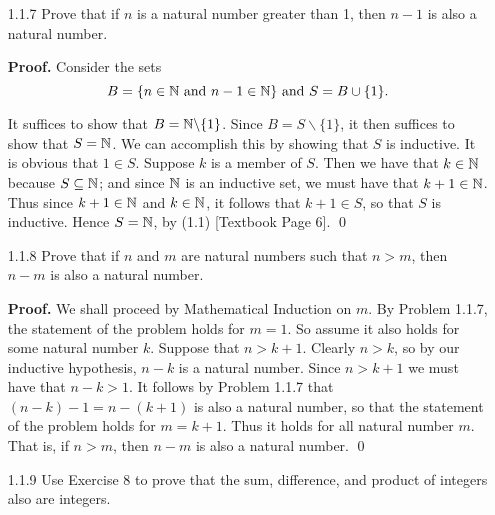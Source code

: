 \begin{enumerate}
      \begin{enumerate}
         \item Since the set of Natural numbers is an inductive set and since
               $m$ is a natural, it must be the case that $m + 1$ is a natural
               number. So assume that for some natural number $k$ that $m + k$ 
               is also a natural number. As we argued above, $(m + k) + 1$
               must also be a natural number. Thus $m + n$ is a natural number
               for all natural numbers $n$. \qed
         \item We have $m \cdot 1 = m$, a natural number by assumption. So 
               assume that for some natural number $k$ that $mk$ is a natural 
               number. Then $m(k+1) = mk + m$. Part (a) tells us that $mk + m$
               is a natural number. Thus $mk$ is a natural number for all
               natural numbers $n$. \qed
      \end{enumerate}
   \item[1.1.7]   Prove that if $n$ is a natural number greater than 1, then
                  $n - 1$ is also a natural number.

      \textbf{Proof.} Consider the sets
      $$B = \{n \in \mathbb{N} \mbox{ and } n - 1 \in \mathbb{N}\} \mbox{ and } 
        S = B \cup \{1\}.$$

      It suffices to show that $B = \mathbb{N}\backslash\{1\}$. Since
      $B = S\backslash\{1\}$, it then suffices to show that $S = \mathbb{N}$. We can
      accomplish this by showing that $S$ is inductive. It is obvious that
      $1 \in S$. Suppose $k$ is a member of $S$. Then we have that $k \in \mathbb{N}$ 
      because $S \subseteq \mathbb{N}$; and since $\mathbb{N}$ is an inductive set, we must have
      that $k + 1 \in \mathbb{N}$. Thus since $k + 1 \in \mathbb{N}$ and $k \in \mathbb{N}$, it follows 
      that $k + 1 \in S$, so that $S$ is inductive. Hence $S = \mathbb{N}$, by (1.1) 
      [Textbook Page 6].  \qed
   \item[1.1.8]   Prove that if $n$ and $m$ are natural numbers such that
                  $n > m$, then $n - m$ is also a natural number.

      \textbf{Proof.} We shall proceed by Mathematical Induction on $m$. By 
      Problem 1.1.7, the statement of the problem holds for $m = 1$. So assume 
      it also holds for some natural number $k$. Suppose that $n > k + 1$. 
      Clearly $n > k$, so by our inductive hypothesis, $n - k$ is a natural 
      number. Since $n > k + 1$ we must have that $n - k > 1$. It follows by 
      Problem 1.1.7 that $(n - k) - 1 = n - (k + 1)$ is also a natural number, 
      so that the statement of the problem holds for $m = k + 1$. Thus it holds
      for all natural number $m$. That is, if $n > m$, then $n - m$ is also a 
      natural number. \qed
   \item[1.1.9]   Use Exercise 8 to prove that the sum, difference, and product 
                  of integers also are integers.
      

\end{enumerate}
